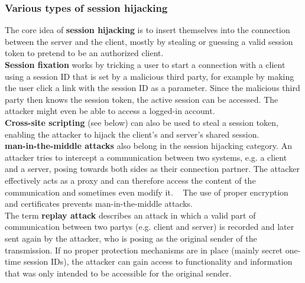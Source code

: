 \documentclass[
	a4paper,
	pagesize,
	pdftex,
	12pt,
	twoside, %
	BCOR=5mm, %
	ngerman,
	fleqn,
	final,
	]{scrartcl}
\begin{document}
\subsubsection{Various types of session hijacking}
The core idea of \textbf{session hijacking} is to insert themselves into the connection between the server and the client, mostly by stealing or guessing a valid session token to pretend to be an authorized client.~\cite{OWASPFoundation.14.8.2014}\\
\textbf{Session fixation} works by tricking a user to start a connection with a client using a session ID that is set by a malicious third party, for example by making the user click a link with the session ID as a parameter. Since the malicious third party then knows the session token, the active session can be accessed. The attacker might even be able to access a logged-in account.
~\cite{OWASPFoundation.14.8.2014}\\
\textbf{Cross-site scripting} (see below) can also be used to steal a session token, enabling the attacker to hijack the client's and server's shared session.\\
\textbf{man-in-the-middle attacks} also belong in the session hijacking category. An attacker tries to intercept a communication between two systems, e.g. a client and a server, posing towards both sides as their connection partner. The attacker effectively acts as a proxy and can therefore access the content of the communication and sometimes even modify it. ~\cite{OWASPFoundation.31.8.2015} The use of proper encryption and certificates prevents man-in-the-middle attacks.\\
The term \textbf{replay attack} describes an attack in which a valid part of communication between two partys (e.g. client and server) is recorded and later sent again by the attacker, who is posing as the original sender of the transmission. If no proper protection mechanisms are in place (mainly secret one-time session IDs), the attacker can gain access to functionality and information that was only intended to be accessible for the original sender.
\end{document}
